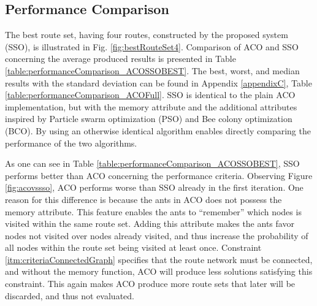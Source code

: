 \subsection{Performance Comparison}
\label{subsec:performanceComparisonDiscussion}


The best route set, having four routes, constructed by the proposed system (SSO), is illustrated in Fig. \vref{fig:bestRouteSet4}. Comparison of ACO and SSO concerning the average produced results is presented in Table \vref{table:performanceComparison_ACOSSOBEST}. The best, worst, and median results with the standard deviation can be found in Appendix \ref{appendixC}, Table \vref{table:performanceComparison_ACOFull}. SSO is identical to the plain ACO implementation, but with the memory attribute and the additional attributes inspired by Particle swarm optimization (PSO) and Bee colony optimization (BCO). By using an otherwise identical algorithm enables directly comparing the performance of the two algorithms. 

As one can see in Table \vref{table:performanceComparison_ACOSSOBEST}, SSO performs better than ACO concerning the performance criteria. Observing Figure \ref{fig:acovssso}, ACO performs worse than SSO already in the first iteration. One reason for this difference is because the ants in ACO does not possess the memory attribute. This feature enables the ants to ``remember'' which nodes is visited within the same route set. Adding this attribute makes the ants favor nodes not visited over nodes already visited, and thus increase the probability of all nodes within the route set being visited at least once. Constraint \vref{itm:criteriaConnectedGraph} specifies that the route network must be connected, and without the memory function, ACO will produce less solutions satisfying this constraint. This again makes ACO produce more route sets that later will be discarded, and thus not evaluated. %


